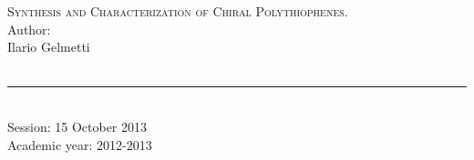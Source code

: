 \documentclass[a4paper,12pt,openright]{book}
\begin{document}
{\begin{titlepage}
\begin{center}
	\huge{\textsc{Synthesis and Characterization of Chiral Polythiophenes.}}\\
\vfill
	\footnotesize{Author:}\\
	\large{Ilario Gelmetti}\\
		\makebox[.2\textwidth]{\rule{0pt}{.02\textheight}}\\
\end{center}
\begin{small}
\bigskip
	\begin{center}
	\rule{3cm}{1pt}\\
	Session: 15 October 2013\\
	Academic year: 2012-2013\\
	\end{center}
\end{small}
\end{titlepage}

\addtocounter{page}{-1}

\tableofcontents
\listoffigures
\listoftables

}
\end{document}
